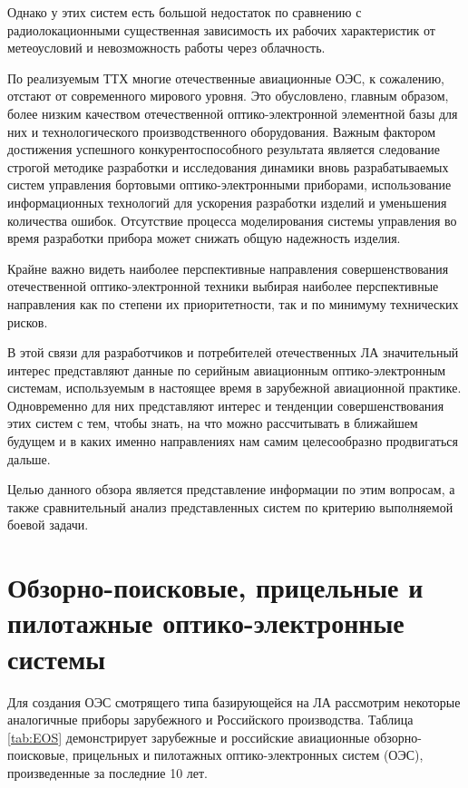 Однако у этих систем есть большой недостаток по сравнению с радиолокационными существенная зависимость их рабочих характеристик от метеоусловий и невозможность работы через облачность. 

По реализуемым ТТХ многие отечественные авиационные ОЭС, к сожалению, отстают от современного мирового уровня. Это обусловлено, главным образом, более низким качеством отечественной оптико-электронной элементной базы для них и технологического производственного оборудования. Важным фактором достижения успешного конкурентоспособного результата является следование строгой методике разработки и исследования динамики вновь разрабатываемых систем управления бортовыми оптико-электронными приборами, использование информационных технологий для ускорения разработки изделий и уменьшения количества ошибок. Отсутствие процесса моделирования системы управления во время разработки прибора может снижать общую надежность изделия.

Крайне важно видеть наиболее перспективные направления совершенствования отечественной оптико-электронной техники выбирая наиболее перспективные направления как по степени их приоритетности, так и по минимуму технических рисков. 

В этой связи для разработчиков и потребителей отечественных ЛА значительный интерес представляют данные по серийным авиационным оптико-электронным системам, используемым в настоящее время в зарубежной авиационной практике. Одновременно для них представляют интерес и тенденции совершенствования этих систем с тем, чтобы знать, на что можно рассчитывать в ближайшем будущем и в каких именно направлениях нам самим целесообразно продвигаться дальше. 

Целью данного обзора является представление информации по этим вопросам, а также сравнительный анализ представленных систем по критерию выполняемой боевой задачи. 

\section{Обзорно-поисковые, прицельные и пилотажные оптико-электронные системы} \label{sec:ch1/sec1-}

Для создания ОЭС смотрящего типа базирующейся на ЛА рассмотрим некоторые аналогичные приборы зарубежного и Российского производства. Таблица \ref{tab:EOS} демонстрирует зарубежные и российские авиационные обзорно-поисковые, прицельных и пилотажных оптико-электронных систем (ОЭС), произведенные за последние 10 лет. 

